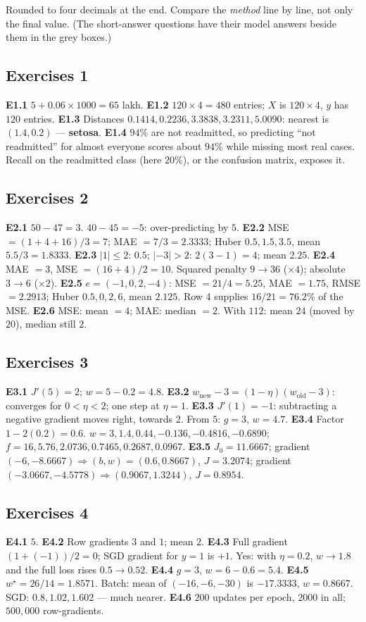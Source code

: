 \documentclass[11pt]{article}
\newcommand{\ans}[1]{\subsection*{#1}}
\begin{document}
Rounded to four decimals at the end. Compare the \emph{method} line by line,
not only the final value. (The short-answer questions have their model
answers beside them in the grey boxes.)

\ans{Exercises 1}
\textbf{E1.1} $5 + 0.06 \times 1000 = 65$ lakh.
\textbf{E1.2} $120 \times 4 = 480$ entries; $X$ is $120 \times 4$, $y$ has
$120$ entries.
\textbf{E1.3} Distances $0.1414, 0.2236, 3.3838, 3.2311, 5.0090$: nearest is
$(1.4, 0.2)$ --- \textbf{setosa}.
\textbf{E1.4} $94\%$ are not readmitted, so predicting ``not readmitted'' for
almost everyone scores about $94\%$ while missing most real cases. Recall on the
readmitted class (here $20\%$), or the confusion matrix, exposes it.

\ans{Exercises 2}
\textbf{E2.1} $50 - 47 = 3$. $40 - 45 = -5$: over-predicting by $5$.
\textbf{E2.2} MSE $= (1 + 4 + 16)/3 = 7$; MAE $= 7/3 = 2.3333$; Huber
$0.5, 1.5, 3.5$, mean $5.5/3 = 1.8333$.
\textbf{E2.3} $|1| \le 2$: $0.5$; $|-3| > 2$: $2(3 - 1) = 4$; mean $2.25$.
\textbf{E2.4} MAE $= 3$, MSE $= (16 + 4)/2 = 10$. Squared penalty $9 \to 36$
($\times 4$); absolute $3 \to 6$ ($\times 2$).
\textbf{E2.5} $e = (-1, 0, 2, -4)$: MSE $= 21/4 = 5.25$, MAE $= 1.75$,
RMSE $= 2.2913$; Huber $0.5, 0, 2, 6$, mean $2.125$. Row 4 supplies
$16/21 = 76.2\%$ of the MSE.
\textbf{E2.6} MSE: mean $= 4$; MAE: median $= 2$. With $112$: mean $24$
(moved by $20$), median still $2$.

\ans{Exercises 3}
\textbf{E3.1} $J'(5) = 2$; $w = 5 - 0.2 = 4.8$.
\textbf{E3.2} $w_{\text{new}} - 3 = (1 - \eta)(w_{\text{old}} - 3)$:
converges for $0 < \eta < 2$; one step at $\eta = 1$.
\textbf{E3.3} $J'(1) = -1$: subtracting a negative gradient moves right,
towards $2$. From $5$: $g = 3$, $w = 4.7$.
\textbf{E3.4} Factor $1 - 2(0.2) = 0.6$. $w = 3, 1.4, 0.44, -0.136, -0.4816,
-0.6890$; $f = 16, 5.76, 2.0736, 0.7465, 0.2687, 0.0967$.
\textbf{E3.5} $J_0 = 11.6667$; gradient $(-6, -8.6667) \Rightarrow (b, w) =
(0.6, 0.8667)$, $J = 3.2074$; gradient $(-3.0667, -4.5778) \Rightarrow
(0.9067, 1.3244)$, $J = 0.8954$.

\ans{Exercises 4}
\textbf{E4.1} $5$.
\textbf{E4.2} Row gradients $3$ and $1$; mean $2$.
\textbf{E4.3} Full gradient $(1 + (-1))/2 = 0$; SGD gradient for $y = 1$ is
$+1$. Yes: with $\eta = 0.2$, $w \to 1.8$ and the full loss rises $0.5 \to
0.52$.
\textbf{E4.4} $g = 3$, $w = 6 - 0.6 = 5.4$.
\textbf{E4.5} $w^\star = 26/14 = 1.8571$. Batch: mean of $(-16, -6, -30)$ is
$-17.3333$, $w = 0.8667$. SGD: $0.8, 1.02, 1.602$ --- much nearer.
\textbf{E4.6} $200$ updates per epoch, $2000$ in all; $500{,}000$
row-gradients.
\end{document}
